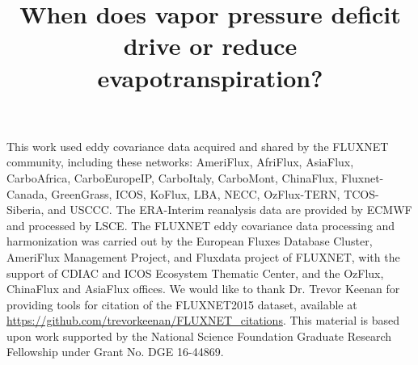 \documentclass[hess, manuscript]{copernicus}
\begin{document}
\title{When does vapor pressure deficit drive or reduce
  evapotranspiration?}








\maketitle

\begin{abstract}

\end{abstract}

\introduction




\conclusions






\begin{acknowledgements}
This work used eddy covariance data acquired and shared
by the FLUXNET community, including these networks: AmeriFlux, AfriFlux,
AsiaFlux, CarboAfrica, CarboEuropeIP, CarboItaly, CarboMont,
ChinaFlux, Fluxnet-Canada, GreenGrass, ICOS, KoFlux, LBA, NECC,
OzFlux-TERN, TCOS-Siberia, and USCCC. The ERA-Interim reanalysis data
are provided by ECMWF and processed by LSCE. The FLUXNET eddy covariance
data processing and harmonization was carried out by the European Fluxes
Database Cluster, AmeriFlux Management Project, and Fluxdata project of
FLUXNET, with the support of CDIAC and ICOS Ecosystem Thematic Center,
and the OzFlux, ChinaFlux and AsiaFlux offices. We would like to thank
Dr. Trevor Keenan for providing tools for citation of the FLUXNET2015
dataset, available at
\url{https://github.com/trevorkeenan/FLUXNET_citations}. This material is
based upon work supported by the National Science Foundation Graduate
Research Fellowship under Grant No. DGE 16-44869.
\end{acknowledgements}



\end{document}
